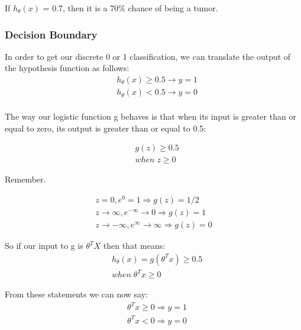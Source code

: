 If $h_{\theta}(x)$ = 0.7, then it is a 70\% chance of being a tumor.


\subsubsection{Decision Boundary}

In order to get our discrete 0 or 1 classification, we can translate the output of the hypothesis function as follows:
\begin{equation}
  \begin{aligned}
    & h_\theta(x) \geq 0.5 \rightarrow y = 1 \\
    & h_\theta(x) < 0.5 \rightarrow y = 0 \\
  \end{aligned}
\end{equation}

The way our logistic function g behaves is that when its input is greater than or equal to zero, its output is greater than or equal to 0.5:

\begin{equation}
  \begin{aligned}& g(z) \geq 0.5 \\
    & when \; z \geq 0\end{aligned}
\end{equation}

Remember.

\begin{equation}
  \begin{aligned}
    z=0, e^{0}=1 \Rightarrow g(z)=1/2\\
    z \to \infty, e^{-\infty} \to 0 \Rightarrow g(z)=1\\
    z \to -\infty, e^{\infty}\to \infty \Rightarrow g(z)=0
  \end{aligned}
\end{equation}

So if our input to g is $\theta^{T}X$ then that means:
\begin{equation}
  \begin{aligned}
    & h_\theta(x) = g(\theta^T x) \geq 0.5 \\
    & when \; \theta^T x \geq 0
  \end{aligned}
\end{equation}

From these statements we can now say:
\begin{equation}
  \begin{aligned}
    & \theta^T x \geq 0 \Rightarrow y = 1\\
    & \theta^T x < 0 \Rightarrow y = 0 \\
  \end{aligned}
\end{equation}

